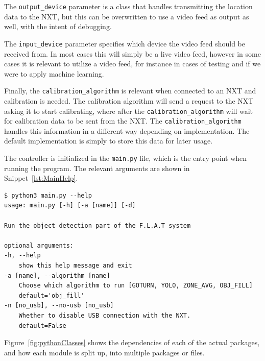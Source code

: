 The \texttt{output\_device} parameter is a class that handles transmitting the location data to the NXT, but this can be overwritten to use a video feed as output as well, with the intent of debugging.


The \texttt{input\_device} parameter specifies which device the video feed should be received from. In most cases this will simply be a live video feed, however in some cases it is relevant to utilize a video feed, for instance in cases of testing and if we were to apply machine learning.

Finally, the \texttt{calibration\_algorithm} is relevant when connected to an NXT and calibration is needed. The calibration algorithm will send a request to the NXT asking it to start calibrating, where after the \texttt{calibration\_algorithm} will wait for calibration data to be sent from the NXT. The \texttt{calibration\_algorithm} handles this information in a different way depending on implementation. The default implementation is simply to store this data for later usage.

The controller is initialized in the \texttt{main.py} file, which is the entry point when running the program. 
The relevant arguments are shown in Snippet~\ref{lst:MainHelp}.
\begin{lstlisting}[label={lst:MainHelp},caption={The help message of the commandline interface}]
$ python3 main.py --help
usage: main.py [-h] [-a [name]] [-d]

Run the object detection part of the F.L.A.T system

optional arguments:
-h, --help            
	show this help message and exit
-a [name], --algorithm [name] 
	Choose which algorithm to run [GOTURN, YOLO, ZONE_AVG, OBJ_FILL]
	default='obj_fill'
-n [no_usb], --no-usb [no_usb]
	Whether to disable USB connection with the NXT.
	default=False
\end{lstlisting}
Figure~\ref{fig:pythonClasses} shows the dependencies of each of the actual packages, and how each module is split up, into multiple packages or files.

